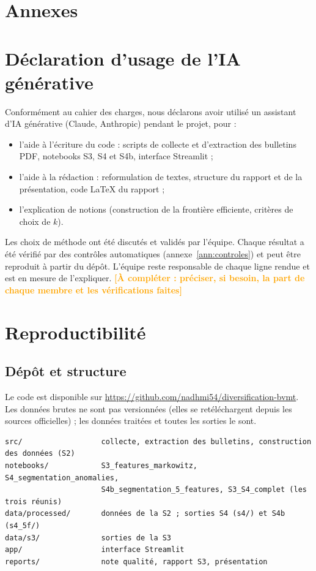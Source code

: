 \documentclass[11pt,a4paper]{article}
\newcommand{\afaire}[1]{\textcolor{orange}{\textbf{[À compléter : #1]}}}
\begin{document}
\clearpage
\appendix
\renewcommand{\thesection}{\Alph{section}}
\section*{Annexes}

\section{Déclaration d'usage de l'IA générative}\label{ann:ia}
Conformément au cahier des charges, nous déclarons avoir utilisé un assistant d'IA générative (Claude, Anthropic) pendant le projet, pour :
\begin{itemize}
  \item l'aide à l'écriture du code : scripts de collecte et d'extraction des bulletins PDF, notebooks S3, S4 et S4b, interface Streamlit ;
  \item l'aide à la rédaction : reformulation de textes, structure du rapport et de la présentation, code \LaTeX{} du rapport ;
  \item l'explication de notions (construction de la frontière efficiente, critères de choix de $k$).
\end{itemize}
Les choix de méthode ont été discutés et validés par l'équipe. Chaque résultat a été vérifié par des contrôles automatiques (annexe~\ref{ann:controles}) et peut être reproduit à partir du dépôt. L'équipe reste responsable de chaque ligne rendue et est en mesure de l'expliquer. \afaire{préciser, si besoin, la part de chaque membre et les vérifications faites}

\section{Reproductibilité}\label{ann:repro}
\subsection*{Dépôt et structure}
Le code est disponible sur \url{https://github.com/nadhmi54/diversification-bvmt}. Les données brutes ne sont pas versionnées (elles se retéléchargent depuis les sources officielles) ; les données traitées et toutes les sorties le sont.

{\footnotesize\begin{verbatim}
src/                  collecte, extraction des bulletins, construction des données (S2)
notebooks/            S3_features_markowitz, S4_segmentation_anomalies,
                      S4b_segmentation_5_features, S3_S4_complet (les trois réunis)
data/processed/       données de la S2 ; sorties S4 (s4/) et S4b (s4_5f/)
data/s3/              sorties de la S3
app/                  interface Streamlit
reports/              note qualité, rapport S3, présentation
\end{verbatim}}
\end{document}
